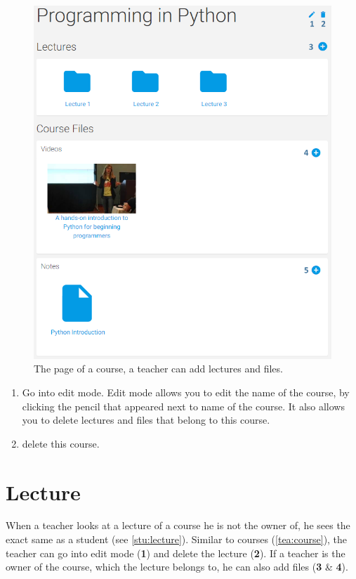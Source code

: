 \documentclass[a4paper,11pt]{report}
\begin{document}
\begin{figure}[H]
\centering
\includegraphics[scale=0.55]{imgs/tea_course.png}
\caption{The page of a course, a teacher can add lectures and files.}
\label{fig:tea_course}
\end{figure}
\begin{enumerate}
\item Go into edit mode. Edit mode allows you to edit the name of the course, by clicking the pencil that appeared next to name of the course. It also allows you to delete lectures and files that belong to this course.
\item delete this course.
\end{enumerate}

\section{Lecture}
When a teacher looks at a lecture of a course he is not the owner of, he sees the exact same as a student (see \ref{stu:lecture}). Similar to courses (\ref{tea:course}), the teacher can go into edit mode (\textbf{1}) and delete the lecture (\textbf{2}). If a teacher is the owner of the course, which the lecture belongs to, he can also add files (\textbf{3} \& \textbf{4}).
\end{document}
